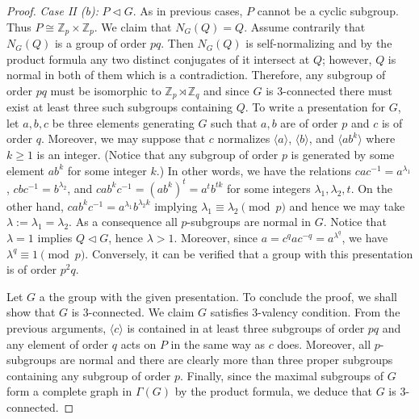 \documentclass[a4paper,12pt]{article}
\theoremstyle{definition}
\theoremstyle{remark}
\theoremstyle{theorem}
\begin{document}
\begin{proof}
  \emph{Case II (b):} $P\triangleleft G$. As in previous cases, $P$
  cannot be a cyclic subgroup. Thus
  $P\cong\mathbb{Z}_p\times\mathbb{Z}_p$. We claim that
  $N_G(Q)=Q$. Assume contrarily that $N_G(Q)$ is a
  group of order $pq$. Then $N_G(Q)$ is self-normalizing and
  by the product formula any two distinct conjugates of it intersect at
  $Q$; however, $Q$ is normal in both of them which is a
  contradiction. Therefore, any subgroup of order $pq$ must be
  isomorphic to $\mathbb{Z}_p\rtimes\mathbb{Z}_q$ and since $G$ is
  $3$-connected there must exist at least three such subgroups
  containing $Q$. To write a presentation for $G$, let $a,b,c$ be
  three elements generating $G$ such that $a,b$ are of order $p$ and
  $c$ is of order $q$. Moreover, we may suppose that $c$ normalizes
  $\langle a\rangle$, $\langle b\rangle$, and $\langle ab^k\rangle$
  where $k\geq 1$ is an integer. (Notice that any subgroup of order
  $p$ is generated by some element $ab^k$ for some integer $k$.) In
  other words, we have the relations $cac^{-1}=a^{\lambda_1}$,
  $cbc^{-1}=b^{\lambda_2}$, and $cab^{k}c^{-1}=(ab^k)^t=a^tb^{tk}$ for
  some integers $\lambda_1,\lambda_2,t$. On the other hand,
  $cab^{k}c^{-1}=a^{\lambda_1}b^{\lambda_2k}$ implying
  $\lambda_1\equiv\lambda_2\pmod{p}$ and hence we may take
  $\lambda:=\lambda_1=\lambda_2$. As a consequence all $p$-subgroups
  are normal in $G$. Notice that $\lambda=1$ implies
  $Q\triangleleft G$, hence $\lambda>1$. Moreover, since
  $a=c^qac^{-q}=a^{\lambda^q}$, we have $\lambda^q\equiv
  1\pmod{p}$.
  Conversely, it can be verified that a group with this presentation
  is of order $p^2q$.

  Let $G$ a the group with the given presentation. To conclude the
  proof, we shall show that $G$ is $3$-connected. We claim $G$
  satisfies $3$-valency condition. From the previous arguments,
  $\langle c\rangle$ is contained in at least three subgroups of order
  $pq$ and any element of order $q$ acts on $P$ in the same way as $c$
  does. Moreover, all $p$-subgroups are normal and there are clearly
  more than three proper subgroups containing any subgroup of order
  $p$. Finally, since the maximal subgroups of $G$ form a complete
  graph in $\Gamma(G)$ by the product formula, we deduce that $G$ is
  $3$-connected.
\end{proof}
\end{document}
